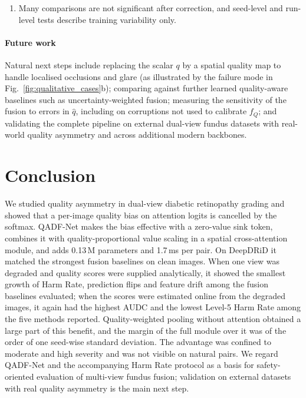 \documentclass[final,5p,times,twocolumn,authoryear]{elsarticle}
\theoremstyle{plain}
\theoremstyle{remark}
\begin{document}
\begin{enumerate}
  \item Many comparisons are not significant after correction, and seed-level and run-level tests describe training variability only.
\end{enumerate}
\endgroup

\paragraph{Future work} Natural next steps include replacing the scalar $q$ by a spatial quality map to handle localised occlusions and glare (as illustrated by the failure mode in Fig.~\ref{fig:qualitative_cases}b); comparing against further learned quality-aware baselines such as uncertainty-weighted fusion; measuring the sensitivity of the fusion to errors in $\hat q$, including on corruptions not used to calibrate $f_Q$; and validating the complete pipeline on external dual-view fundus datasets with real-world quality asymmetry and across additional modern backbones.

\section{Conclusion}
\label{sec:conclusion}

We studied quality asymmetry in dual-view diabetic retinopathy grading and showed that a per-image quality bias on attention logits is cancelled by the softmax. QADF-Net makes the bias effective with a zero-value sink token, combines it with quality-proportional value scaling in a spatial cross-attention module, and adds 0.13\,M parameters and 1.7\,ms per pair. On DeepDRiD it matched the strongest fusion baselines on clean images. When one view was degraded and quality scores were supplied analytically, it showed the smallest growth of Harm Rate, prediction flips and feature drift among the fusion baselines evaluated; when the scores were estimated online from the degraded images, it again had the highest AUDC and the lowest Level-5 Harm Rate among the five methods reported. Quality-weighted pooling without attention obtained a large part of this benefit, and the margin of the full module over it was of the order of one seed-wise standard deviation. The advantage was confined to moderate and high severity and was not visible on natural pairs. We regard QADF-Net and the accompanying Harm Rate protocol as a basis for safety-oriented evaluation of multi-view fundus fusion; validation on external datasets with real quality asymmetry is the main next step.
\end{document}
